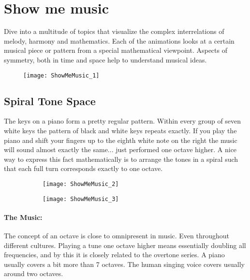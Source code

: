 \section{Show me music}
Dive into a multitude of topics that visualize the complex interrelations of melody, harmony and mathematics. Each of the animations looks at a certain musical piece or pattern from a special mathematical viewpoint. Aspects of symmetry, both in time and space help to understand musical ideas.

\begin{figure}[!h]
\centering
\texttt{[image: ShowMeMusic\_1]}
\end{figure}

\subsection{Spiral Tone Space}
The keys on a piano form a pretty regular pattern. Within every group of seven white keys the pattern of black and white keys repeats exactly. If you play the piano and shift your fingers up to the eighth white note on the right the music will sound almost exactly the same... just performed one octave higher. A nice way to express this fact mathematically is to arrange the tones in a spiral such that each full turn corresponds exactly to one octave.

\begin{figure}[h]
\centering
\begin{subfigure}{0.45\textwidth}
\centering
\texttt{[image: ShowMeMusic\_2]}
\end{subfigure}
\begin{subfigure}{0.45\textwidth}
\centering
\texttt{[image: ShowMeMusic\_3]}
\end{subfigure}
\end{figure}


\paragraph{The Music:} The concept of an octave is close to omnipresent in music. Even throughout different cultures. Playing a tune one octave higher means essentially doubling all frequencies, and by this it is closely related to the overtone series. A piano usually covers a bit more than 7 octaves. The human singing voice covers usually around two octaves.

